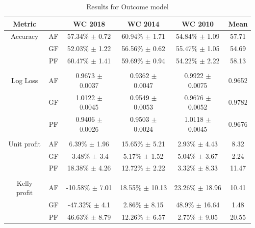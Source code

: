 \begin{table}
    \caption{Results for Outcome model}
    \begin{tabular}{| c  c| c| c| c|c|}
        \hline
        Metric& & \textbf{WC 2018} & \textbf{WC 2014} & \textbf{WC 2010} & Mean\\
        \hline
        Accuracy & AF & 57.34\% $\pm$ 0.72 & 60.94\% $\pm$ 1.71 & 54.84\% $\pm$ 1.09& 57.71 \\
         & GF & 52.03\% $\pm$ 1.22 & 56.56\% $\pm$ 0.62 & 55.47\% $\pm$ 1.05& 54.69 \\
         & PF & 60.47\% $\pm$ 1.41 & 59.69\% $\pm$ 0.94 & 54.22\% $\pm$ 2.22& 58.13 \\
         & & & & & \\
        Log Loss & AF & 0.9673 $\pm$ 0.0037 & 0.9362 $\pm$ 0.0047 & 0.9922 $\pm$ 0.0075& 0.9652 \\
         & GF & 1.0122 $\pm$ 0.0045 & 0.9549 $\pm$ 0.0053 & 0.9676 $\pm$ 0.0052& 0.9782 \\
         & PF & 0.9406 $\pm$ 0.0026 & 0.9503 $\pm$ 0.0024 & 1.0118 $\pm$ 0.0045& 0.9676 \\
         & & & & & \\
        Unit profit & AF & 6.39\% $\pm$ 1.96 & 15.65\% $\pm$ 5.21 & 2.93\% $\pm$ 4.43& 8.32 \\
         & GF & -3.48\% $\pm$ 3.4 & 5.17\% $\pm$ 1.52 & 5.04\% $\pm$ 3.67& 2.24 \\
         & PF & 18.38\% $\pm$ 4.26 & 12.72\% $\pm$ 2.22 & 3.32\% $\pm$ 8.33& 11.47 \\
         & & & & & \\
        Kelly profit & AF & -10.58\% $\pm$ 7.01 & 18.55\% $\pm$ 10.13 & 23.26\% $\pm$ 18.96& 10.41 \\
         & GF & -47.32\% $\pm$ 4.1 & 2.86\% $\pm$ 8.15 & 48.9\% $\pm$ 16.64& 1.48 \\
         & PF & 46.63\% $\pm$ 8.79 & 12.26\% $\pm$ 6.57 & 2.75\% $\pm$ 9.05& 20.55 \\
 \hline
    \end{tabular}
    \label{table:outcomemodel}
\end{table}


